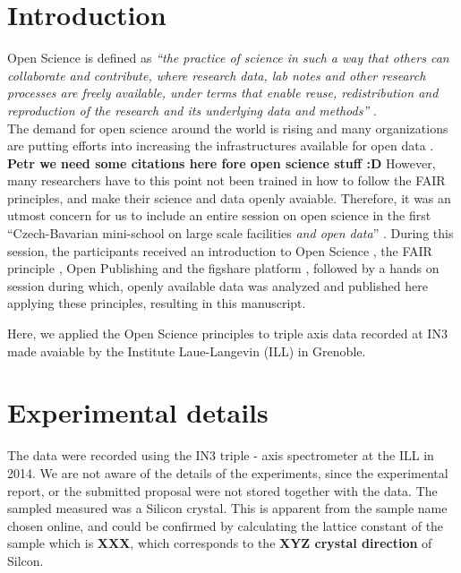 \documentclass[aps,prx,reprint,amsmath,amssymb,superscriptaddress,showpacs]{revtex4-1}
\begin{document}
\maketitle



\section{Introduction}

Open Science is defined as \emph{``the practice of science in such a way that others can collaborate and contribute, where research data, lab notes and other research processes are freely available, under terms that enable reuse, redistribution and reproduction of the research and its underlying data and methods''} \cite{foster}.\\

The demand for open science around the world is rising and many organizations are putting efforts into increasing the infrastructures available for open data \cite{panosc, nfdi, expands}. \textbf{Petr we need some citations here fore open science stuff :D}
However, many researchers have to this point not been trained in how to follow the FAIR principles, and make their science and data openly avaiable. 
Therefore, it was an utmost concern for us to include an entire session on open science in the first ``Czech-Bavarian mini-school on large scale facilities \emph{and open data}'' \cite{mini-school}.
During this session, the participants received an introduction to Open Science \cite{foster}, the FAIR principle \cite{FAIR}, Open Publishing \cite{arXiv} and the figshare platform \cite{figshare}, followed by a hands on session during which, openly available data was analyzed and published here applying these principles, resulting in this manuscript.
 
Here, we applied the Open Science principles to triple axis data recorded at IN3 \cite{IN3} made avaiable by the Institute Laue-Langevin (ILL) in Grenoble.

\section{Experimental details}

The data were recorded using the IN3 triple - axis spectrometer \cite{IN3} at the ILL in 2014.
We are not aware of the details of the experiments, since the experimental report, or the submitted proposal were not stored together with the data.
The sampled measured was a Silicon crystal. 
This is apparent from the sample name chosen online, and could be confirmed by calculating the lattice constant of the sample which is \textbf{XXX}, which corresponds to the \textbf{XYZ crystal direction} of Silcon.
\end{document}
